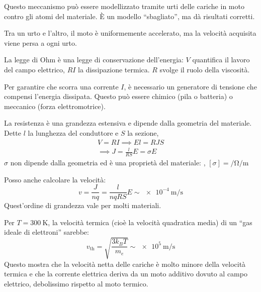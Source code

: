 Questo meccanismo può essere modellizzato tramite urti delle cariche in moto contro gli atomi del materiale.
È un modello ``sbagliato'', ma dà risultati corretti.

Tra un urto e l'altro, il moto è uniformemente accelerato, ma la velocità acquisita viene persa a ogni urto.

La legge di Ohm è una legge di conservazione dell'energia: $V$ quantifica il lavoro del campo elettrico, $RI$ la dissipazione termica.
$R$ svolge il ruolo della viscosità.

Per garantire che scorra una corrente $I$, è necessario un generatore di tensione che compensi l'energia dissipata.
Questo può essere chimico (pila o batteria) o meccanico (forza elettromotrice).

La resistenza è una grandezza estensiva e dipende dalla geometria del materiale.
Dette $l$ la lunghezza del conduttore e $S$ la sezione,
\begin{gather}
    V = RI
    \implies E l = R J S \\
    \implies J = \frac{l}{RS} E = \sigma E
\end{gather}
$\sigma$ non dipende dalla geometria ed è una proprietà del materiale: , $[\sigma] = \unit{\per\ohm\per\metre}$

Posso anche calcolare la velocità:
\begin{equation}
    v = \frac{J}{nq} = \frac{l}{n q R S} E \sim \qty{e-4}{\metre\per\second}
\end{equation}
Quest'ordine di grandezza vale per molti materiali.

Per $T = \qty{300}{\kelvin}$, la velocità termica (cioè la velocità quadratica media) di un ``gas ideale di elettroni'' sarebbe:
\begin{equation}
    v_\text{th} = \sqrt{\frac{3 k_B T}{m_e}} \sim \qty{e5}{\metre\per\second}
\end{equation}
Questo mostra che la velocità netta delle cariche è molto minore della velocità termica e che la corrente elettrica deriva da un moto additivo dovuto al campo elettrico, debolissimo rispetto al moto termico.
